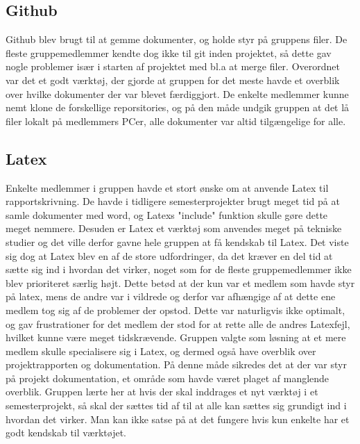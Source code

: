 \subsection{Github}
Github blev brugt til at gemme dokumenter, og holde styr på gruppens filer. De fleste gruppemedlemmer kendte dog ikke til git inden projektet, 
så dette gav nogle problemer især i starten af projektet med bl.a at merge filer. Overordnet var det et godt værktøj, der gjorde at gruppen for det meste havde
et overblik over hvilke dokumenter der var blevet færdiggjort. De enkelte medlemmer kunne nemt klone de forskellige reporsitories, og på den måde undgik gruppen
at det lå filer lokalt på medlemmers PCer, alle dokumenter var altid tilgængelige for alle.  

\subsection{Latex}
Enkelte medlemmer i gruppen havde et stort ønske om at anvende Latex til rapportskrivning. De havde i tidligere semesterprojekter brugt meget tid på at
samle dokumenter med word, og Latexs "include" funktion skulle gøre dette meget nemmere. Desuden er Latex et værktøj som anvendes meget på tekniske studier
og det ville derfor gavne hele gruppen at få kendskab til Latex. Det viste sig dog at Latex blev en af de store udfordringer, da det kræver en del
tid at sætte sig ind i hvordan det virker, noget som for de fleste gruppemedlemmer ikke blev prioriteret særlig højt. Dette betød at der kun var et medlem som havde 
styr på latex, mens de andre var i vildrede og derfor var afhængige af at dette ene medlem tog sig af de problemer der opstod. Dette var naturligvis ikke 
optimalt, og gav frustrationer for det medlem der stod for at rette alle de andres Latexfejl, hvilket kunne være meget tidskrævende. Gruppen valgte som løsning 
at et mere medlem skulle specialisere sig i Latex, og dermed også have overblik over projektrapporten og dokumentation. På denne måde sikredes det at der var 
styr på projekt dokumentation, et område som havde været plaget af manglende overblik. Gruppen lærte her at hvis der skal inddrages et nyt værktøj i et 
semesterprojekt, så skal der sættes tid af til at alle kan sættes sig grundigt ind i hvordan det virker. Man kan ikke satse på at det fungere hvis kun enkelte 
har et godt kendskab til værktøjet. 

